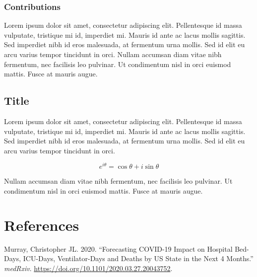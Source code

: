 \documentclass[
]{hdsr}
\newlength{\cslhangindent}
\newlength{\cslentryspacingunit} %
\newenvironment{CSLReferences}[2] %
 {%
  \setlength{\parindent}{0pt}
  \ifodd #1
  \let\oldpar\par
  \def\par{\hangindent=\cslhangindent\oldpar}
  \fi
  \setlength{\parskip}{#2\cslentryspacingunit}
 }%
 {}
\begin{document}
\hypertarget{contributions}{%
\subsubsection*{Contributions}\label{contributions}}

Lorem ipsum dolor sit amet, consectetur adipiscing elit. Pellentesque id
massa vulputate, tristique mi id, imperdiet mi. Mauris id ante ac lacus
mollis sagittis. Sed imperdiet nibh id eros malesuada, at fermentum urna
mollis. Sed id elit eu arcu varius tempor tincidunt in orci. Nullam
accumsan diam vitae nibh fermentum, nec facilisis leo pulvinar. Ut
condimentum nisl in orci euismod mattis. Fusce at mauris augue.

\hypertarget{sec-appendix-customize-this-label}{%
\subsection{Title}\label{sec-appendix-customize-this-label}}

Lorem ipsum dolor sit amet, consectetur adipiscing elit. Pellentesque id
massa vulputate, tristique mi id, imperdiet mi. Mauris id ante ac lacus
mollis sagittis. Sed imperdiet nibh id eros malesuada, at fermentum urna
mollis. Sed id elit eu arcu varius tempor tincidunt in orci.

\[
e^{i\theta} = \cos \theta + i\sin \theta
\]

Nullam accumsan diam vitae nibh fermentum, nec facilisis leo pulvinar.
Ut condimentum nisl in orci euismod mattis. Fusce at mauris augue.

\hypertarget{bibliography}{%
\section*{References}\label{bibliography}}

\hypertarget{refs}{}
\begin{CSLReferences}{1}{0}
\leavevmode{}%
Murray, Christopher JL. 2020. {``Forecasting {COVID-19} Impact on
Hospital Bed-Days, {ICU}-Days, Ventilator-Days and Deaths by {US} State
in the Next 4 Months.''} \emph{medRxiv}.
\url{https://doi.org/10.1101/2020.03.27.20043752}.

\end{CSLReferences}
\end{document}
